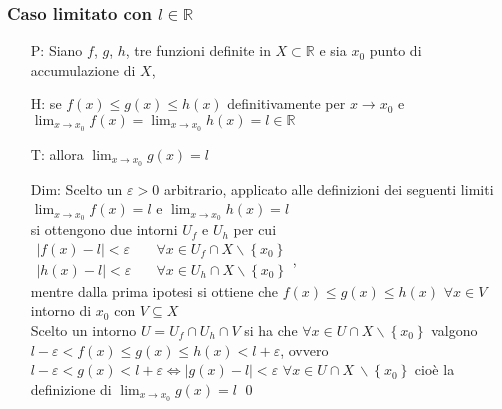 \documentclass[a4paper]{article}
\begin{document}
\subsubsection*{Caso limitato con \(l \in \mathbb{R}\)}
\begin{itemize}
	\item[P: ] Siano \(f\), \(g\), \(h\), tre funzioni definite in \(X \subset \mathbb{R}\) e sia \(x_0\) punto di accumulazione di \(X\),
	\item[H: ] se \(f(x) \leq g(x) \leq h(x)\) definitivamente per \(x \to x_0\) e \(\displaystyle \lim_{x \to x_0} f(x) = \lim_{x \to x_0} h(x) = l \in \mathbb{R}\)
	\item[T: ] allora \(\displaystyle \lim_{x \to x_0} g(x) = l\)
	\item[Dim:] Scelto un \(\varepsilon > 0\) arbitrario, applicato alle definizioni dei seguenti limiti \(\displaystyle \lim_{x \to x_0} f(x) = l\) e \(\displaystyle \lim_{x \to x_0} h(x) = l\) \\
	si ottengono due intorni \(U_f\) e \(U_h\) per cui \(\begin{aligned}
		\left| f(x) - l \right| < \varepsilon \quad &\forall x \in U_f \cap X \backslash \left\{ x_0 \right\} \\
		\left| h(x) - l \right| < \varepsilon \quad &\forall x \in U_h \cap X \backslash \left\{ x_0 \right\}
	\end{aligned}\), \\ 
	mentre dalla prima ipotesi si ottiene che \(f(x) \leq g(x) \leq h(x)\) \(\forall x \in V\) intorno di \(x_0\) con \(V \subseteq X\) \\
	Scelto un intorno \(U = U_f \cap U_h \cap V\) si ha che \(\forall x \in U \cap X \backslash \left\{ x_0 \right\}\) valgono \\
	\(l - \varepsilon < f(x) \leq g(x) \leq h(x) < l + \varepsilon\), ovvero \(l - \varepsilon < g(x) < l + \varepsilon \Leftrightarrow \left| g(x) - l \right| < \varepsilon\) \(\forall x \in U \cap X \  \backslash \left\{ x_0 \right\}\)
	cioè la definizione di \(\displaystyle \lim_{x \to x_0} g(x) = l\) \qed
\end{itemize}
\end{document}
